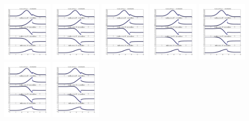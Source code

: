 \documentclass[11pt]{article}
\begin{document}
\vskip 10pt 
\includegraphics[width=0.19\textwidth]{frame0104fig1.png}
\vskip 10pt 
\includegraphics[width=0.19\textwidth]{frame0105fig1.png}
\vskip 10pt 
\includegraphics[width=0.19\textwidth]{frame0106fig1.png}
\vskip 10pt 
\includegraphics[width=0.19\textwidth]{frame0107fig1.png}
\vskip 10pt 
\includegraphics[width=0.19\textwidth]{frame0108fig1.png}
\vskip 10pt 
\includegraphics[width=0.19\textwidth]{frame0109fig1.png}
\vskip 10pt 
\includegraphics[width=0.19\textwidth]{frame0110fig1.png}
\end{document}

